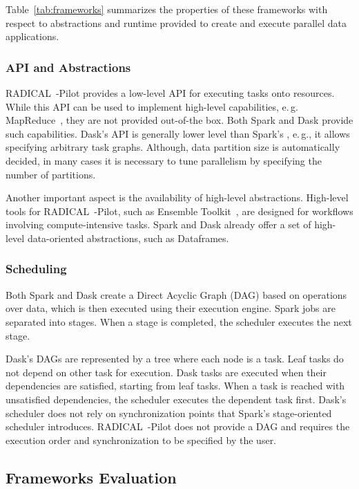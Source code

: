 Table~\ref{tab:frameworks} summarizes the properties of these frameworks with respect to abstractions and runtime provided to create and execute parallel data applications. 

\subsubsection*{API and Abstractions} 
RADICAL~-Pilot provides a low-level API for executing tasks onto resources.
While this API can be used to implement high-level capabilities, e.\,g. MapReduce~\cite{mantha2012pilot}, they are not provided out-of-the box.
Both Spark and Dask provide such capabilities.
Dask's API is generally lower level than Spark's , e.\,g., it allows specifying arbitrary task graphs.
Although, data partition size is automatically decided, in many cases it is necessary to tune parallelism by specifying the number of partitions.

Another important aspect is the availability of high-level abstractions.
High-level tools for RADICAL~-Pilot, such as Ensemble Toolkit~\cite{balasubramanian2018harnessing}, are designed for workflows involving compute-intensive tasks.
Spark and Dask already offer a set of high-level data-oriented abstractions, such as Dataframes.

\subsubsection*{Scheduling}
Both Spark and Dask create a Direct Acyclic Graph (DAG) based on operations over data, which is then executed using their execution engine.
Spark jobs are separated into stages.
When a stage is completed, the scheduler executes the next stage.

Dask's DAGs are represented by a tree where each node is a task.
Leaf tasks do not depend on other task for execution.
Dask tasks are executed when their dependencies are satisfied, starting from leaf tasks.
When a task is reached with unsatisfied dependencies, the scheduler executes the dependent task first.
Dask's scheduler does not rely on synchronization points that Spark's stage-oriented scheduler introduces.
RADICAL~-Pilot does not provide a DAG and requires the execution order and synchronization to be specified by the user.

\subsection{Frameworks Evaluation}
\label{sec:framework_eval}

